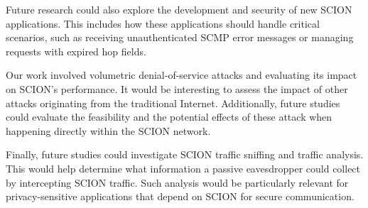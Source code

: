 Future research could also explore the development and security of new SCION applications.
This includes how these applications should handle critical scenarios, such as receiving unauthenticated SCMP error messages or managing requests with expired hop fields.

Our work involved volumetric denial-of-service attacks and evaluating its impact on SCION's performance.
It would be interesting to assess the impact of other attacks originating from the traditional Internet.
Additionally, future studies could evaluate the feasibility and the potential effects of these attack when happening directly within the SCION network.

Finally, future studies could investigate SCION traffic sniffing and traffic analysis.
This would help determine what information a passive eavesdropper could collect by intercepting SCION traffic.
Such analysis would be particularly relevant for privacy-sensitive applications that depend on SCION for secure communication.

